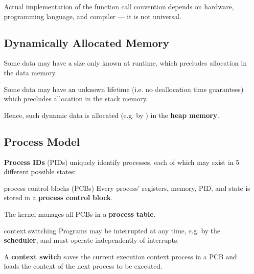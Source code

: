 Actual implementation of the function call convention depends on hardware, programming language, and compiler --- it is not universal.

\subsection{Dynamically Allocated Memory}
Some data may have a size only known at runtime, which precludes allocation in the data memory.

Some data may have an unknown lifetime (i.e. no deallocation time guarantees) which precludes allocation in the stack memory.

Hence, such dynamic data is allocated (e.g. by ) in the \textbf{heap memory}.

\subsection{Process Model}
\textbf{Process IDs} (PIDs) uniquely identify processes, each of which may exist in 5 different possible states:

\begin{enumerate}
\end{enumerate}

\begin{defn}{process control blocks (PCBs)}
    Every process' registers, memory, PID, and state is stored in a \textbf{process control block}.
    
    The kernel manages all PCBs in a \textbf{process table}.
\end{defn}

\begin{defn}{context switching}
    Programs may be interrupted at any time, e.g. by the \textbf{scheduler},
    and must operate independently of interrupts.
    
    A \textbf{context switch} saves the current execution context process in a PCB and loads the context of the next process to be executed.
\end{defn}

